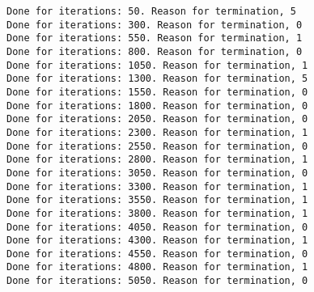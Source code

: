 \documentclass[11pt]{article}
\begin{document}
    \begin{Verbatim}[commandchars=\\\{\}]
Done for iterations: 50. Reason for termination, 5
Done for iterations: 300. Reason for termination, 0
Done for iterations: 550. Reason for termination, 1
Done for iterations: 800. Reason for termination, 0
Done for iterations: 1050. Reason for termination, 1
Done for iterations: 1300. Reason for termination, 5
Done for iterations: 1550. Reason for termination, 0
Done for iterations: 1800. Reason for termination, 0
Done for iterations: 2050. Reason for termination, 0
Done for iterations: 2300. Reason for termination, 1
Done for iterations: 2550. Reason for termination, 0
Done for iterations: 2800. Reason for termination, 1
Done for iterations: 3050. Reason for termination, 0
Done for iterations: 3300. Reason for termination, 1
Done for iterations: 3550. Reason for termination, 1
Done for iterations: 3800. Reason for termination, 1
Done for iterations: 4050. Reason for termination, 0
Done for iterations: 4300. Reason for termination, 1
Done for iterations: 4550. Reason for termination, 0
Done for iterations: 4800. Reason for termination, 1
Done for iterations: 5050. Reason for termination, 0

    \end{Verbatim}
\end{document}
